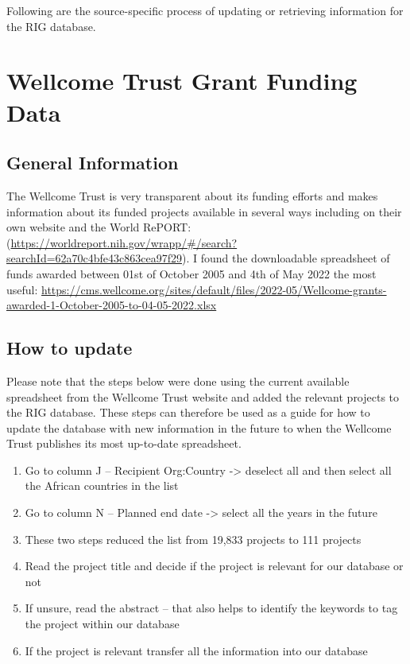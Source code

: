 \documentclass[
]{book}
\begin{document}
Following are the source-specific process of updating or retrieving information for the RIG database.

\hypertarget{update-wellcome}{%
\section{Wellcome Trust Grant Funding Data}\label{update-wellcome}}

\hypertarget{general-information}{%
\subsection{General Information}\label{general-information}}

The Wellcome Trust is very transparent about its funding efforts and makes information about its funded projects available in several ways including on their own website and the World RePORT: (\url{https://worldreport.nih.gov/wrapp/\#/search?searchId=62a70c4bfe43c863cea97f29}). I found the downloadable spreadsheet of funds awarded between 01st of October 2005 and 4th of May 2022 the most useful: \url{https://cms.wellcome.org/sites/default/files/2022-05/Wellcome-grants-awarded-1-October-2005-to-04-05-2022.xlsx}

\hypertarget{how-to-update}{%
\subsection{How to update}\label{how-to-update}}

Please note that the steps below were done using the current available spreadsheet from the Wellcome Trust website and added the relevant projects to the RIG database. These steps can therefore be used as a guide for how to update the database with new information in the future to when the Wellcome Trust publishes its most up-to-date spreadsheet.

\begin{enumerate}
\def\labelenumi{\arabic{enumi}.}
\item
  Go to column J -- Recipient Org:Country -\textgreater{} deselect all and then select all the African countries in the list
\item
  Go to column N -- Planned end date -\textgreater{} select all the years in the future
\item
  These two steps reduced the list from 19,833 projects to 111 projects
\item
  Read the project title and decide if the project is relevant for our database or not
\item
  If unsure, read the abstract -- that also helps to identify the keywords to tag the project within our database
\item
  If the project is relevant transfer all the information into our database
\end{enumerate}
\end{document}
